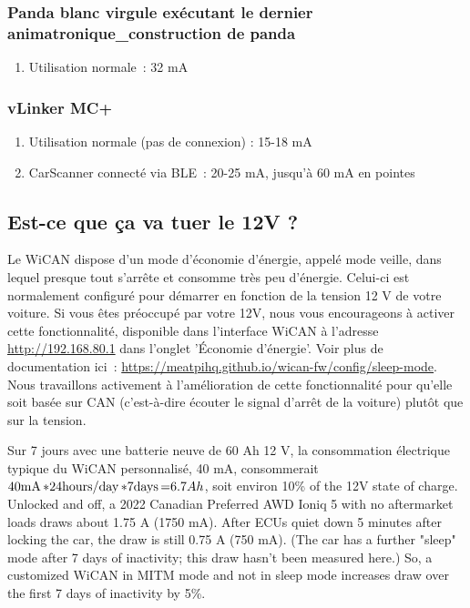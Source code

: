 \documentclass[superscriptaddress,onecolumn,floatfix]{revtex4-2}
\begin{document}
\subsubsection{Panda blanc virgule exécutant le dernier animatronique\_construction de panda}
\begin{enumerate}
  \item{Utilisation normale :} 32 mA
\end{enumerate}

\subsubsection{vLinker MC+}
\begin{enumerate}
  \item{Utilisation normale (pas de connexion) :} 15-18 mA
  \item{CarScanner connecté via BLE :} 20-25 mA, jusqu'à 60 mA en pointes
\end{enumerate}

\subsection{Est-ce que ça va tuer le 12V ?}

Le WiCAN dispose d'un mode d'économie d'énergie, appelé mode veille, dans lequel presque tout s'arrête et consomme très peu d'énergie. Celui-ci est normalement configuré pour démarrer en fonction de la tension 12 V de votre voiture. Si vous êtes préoccupé par votre 12V, nous vous encourageons à activer cette fonctionnalité, disponible dans l'interface WiCAN à l'adresse \href{http://192.168.80.1}{http://192.168.80.1} dans l'onglet 'Économie d'énergie'. Voir plus de documentation ici : \href{https://meatpihq.github.io/wican-fw/config/sleep-mode}{https://meatpihq.github.io/wican-fw/config/sleep-mode}. Nous travaillons activement à l'amélioration de cette fonctionnalité pour qu'elle soit basée sur CAN (c'est-à-dire écouter le signal d'arrêt de la voiture) plutôt que sur la tension. 

Sur 7 jours avec une batterie neuve de 60 Ah 12 V, la consommation électrique typique du WiCAN personnalisé, 40 mA, consommerait $40 \unit[\mathrm{mA}] * 24 \unit[\mathrm{hours/day}] * 7 \unit[\mathrm{days}] = 6.7 Ah$, soit environ 10\% of the 12V state of charge. Unlocked and off, a 2022 Canadian Preferred AWD Ioniq 5 with no aftermarket loads draws about 1.75 A (1750 mA). After ECUs quiet down 5 minutes after locking the car, the draw is still 0.75 A (750 mA). (The car has a further "sleep" mode after 7 days of inactivity; this draw hasn't been measured here.) So, a customized WiCAN in MITM mode and not in sleep mode increases draw over the first 7 days of inactivity by 5\%.
\end{document}
